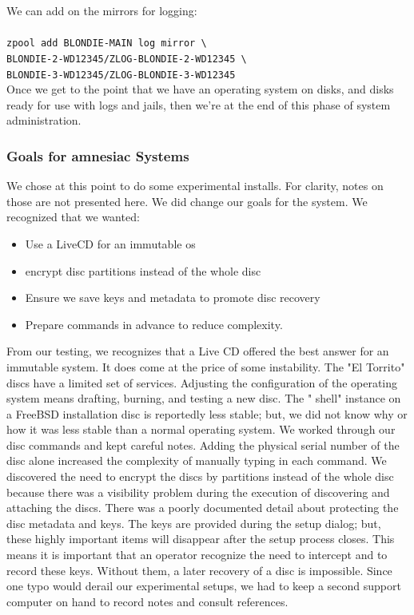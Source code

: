 We can add on the \gls{mirror}s for logging:\\\\
\texttt{zpool add BLONDIE-MAIN log \gls{mirror} \textbackslash}\\
\texttt{BLONDIE-2-WD12345/ZLOG-BLONDIE-2-WD12345 \textbackslash}\\
\texttt{BLONDIE-3-WD12345/ZLOG-BLONDIE-3-WD12345}\\


Once we get to the point that we have an  \gls{operating system} on disks, and disks ready for use with logs and jails, then we're at the end of this phase of system administration.

\subsubsection{Goals for \Gls{amnesiac} Systems}
\label{sec:amnesiac-boot}
We chose at this point to do some experimental installs.  For clarity, notes on those are not presented here.  We did change our goals for the system.  We recognized that we wanted:
\begin{itemize}
\item Use a LiveCD for an immutable \gls{os}
\item  {} \Gls{encrypt} disc partitions instead of the whole disc
\item Ensure we save keys and  \gls{metadata} to promote disc recovery
\item Prepare commands in advance to reduce complexity.
\end{itemize}

From our testing, we recognizes that a Live CD offered the best answer for an \gls{immutable system}.  It does come at the price of some instability.  The "El Torrito" discs have a limited set of services.  Adjusting the \gls{configuration} of the  \gls{operating system} means drafting, burning, and testing a new disc.  The " \gls{shell}" instance on a FreeBSD installation disc is reportedly less stable; but, we did not know why or how it was less stable than a normal  \gls{operating system}.  We worked through our disc commands and kept careful notes.  Adding the physical serial number of the disc alone increased the complexity of manually typing in each command.  We discovered the need to   \gls{encrypt} the discs by partitions instead of the whole disc because there was a visibility problem during the execution of discovering and attaching the discs.  There was a poorly documented detail about protecting the disc  \gls{metadata} and keys.  The keys are provided during the setup   \gls{dialog}; but, these highly important items will disappear after the setup process closes.  This means it is important that an operator recognize the need to intercept and to record these keys.  Without them, a later recovery of a disc is impossible.  Since one typo would derail our experimental setups, we had to keep a second support computer on hand to record notes and consult references.

